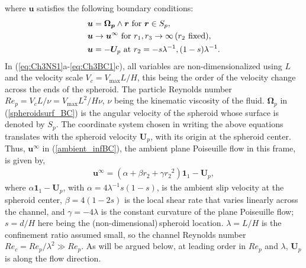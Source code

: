 \documentclass{jfm}
\begin{document}
where $\bm{u}$ satisfies the following boundary conditions:
\begin{subequations}
	\begin{align}
	\bm{u}&=\bm{\Omega_p}\wedge \bm{r} \text{ for } \bm{r}\in S_p, \label{spheroidsurf_BC}\\
	\bm{u}&\rightarrow \bm{u}^\infty \text{ for } r_1,r_3\rightarrow \infty\,(r_2\hspace*{0.05in}\text{fixed}), \label{ambient_infBC}\\
	\bm{u}&=-\bm{U}_p \text{ at } r_2=-s\lambda^{-1}, (1-s)\lambda^{-1}.
	\end{align} \label{eq:Ch3BC1}
\end{subequations}
In (\ref{eq:Ch3NS1}a-\ref{eq:Ch3BC1}c), all variables are non-dimensionalized using $L$ and the velocity scale $V_c=V_\text{max}L/H$, this being the order of the velocity change across the ends of the spheroid. 
The particle Reynolds number $Re_p=V_c L/\nu = V_\text{max}L^2/H\nu$, $\nu$ being the kinematic viscosity of the fluid. $\bm{\Omega}_p$ in (\ref{spheroidsurf_BC}) is the angular velocity of the spheroid whose surface is denoted by $S_p$. The coordinate system chosen in writing the above equations translates with the spheroid velocity $\bm{U}_p$, with its origin at the spheroid center. Thus, $\bm{u}^\infty$ in (\ref{ambient_infBC}), the ambient plane Poiseuille flow in this frame, is given by,
\begin{align}
\bm{u}^\infty=(\alpha+\beta r_2 +\gamma {r_2}^2)\bm{1}_1-\bm{U}_p,
\label{eq:Ch3uamb}
\end{align}
where $\alpha \bm{1}_1 - \bm{U}_p$, with $\alpha=4 \lambda^{-1} s(1-s)$, is the ambient slip velocity at the spheroid center, $\beta=4(1-2s)$  is the local shear rate that varies linearly across the channel, and $\gamma=-4\lambda$ is the constant curvature of the plane Poiseuille flow; $s = d/H$ here  being the (non-dimensional)\,spheroid location. $\lambda=L/H$ is the confinement ratio assumed small, so the channel Reynolds number  $Re_c=Re_p/\lambda^2 \gg Re_p$. As will be argued below, at leading order in $Re_p$ and $\lambda$, $\bm{U}_p$ is along the flow direction.
\end{document}
